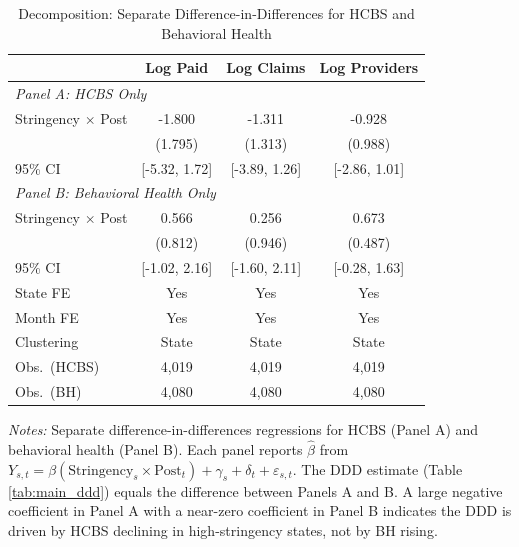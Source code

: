 \begin{table}[htbp]
\centering
\caption{Decomposition: Separate Difference-in-Differences for HCBS and Behavioral Health}
\label{tab:decomposition}
\small
\begin{tabular}{lccc}
\hline\hline
 & Log Paid & Log Claims & Log Providers \\
\hline
\multicolumn{4}{l}{\textit{Panel A: HCBS Only}} \\[3pt]
Stringency $\times$ Post & -1.800 & -1.311 & -0.928 \\
 & (1.795) & (1.313) & (0.988) \\
95\% CI & [-5.32, 1.72] & [-3.89, 1.26] & [-2.86, 1.01] \\
[6pt]
\multicolumn{4}{l}{\textit{Panel B: Behavioral Health Only}} \\[3pt]
Stringency $\times$ Post & 0.566 & 0.256 & 0.673 \\
 & (0.812) & (0.946) & (0.487) \\
95\% CI & [-1.02, 2.16] & [-1.60, 2.11] & [-0.28, 1.63] \\
[6pt]
\hline
State FE & Yes & Yes & Yes \\
Month FE & Yes & Yes & Yes \\
Clustering & State & State & State \\
Obs.~(HCBS) & 4,019 & 4,019 & 4,019 \\
Obs.~(BH) & 4,080 & 4,080 & 4,080 \\
\hline\hline
\end{tabular}
\begin{minipage}{0.85\textwidth}
\vspace{4pt}
\footnotesize
\textit{Notes:} Separate difference-in-differences regressions for HCBS (Panel A) and behavioral health (Panel B). Each panel reports $\hat{\beta}$ from $Y_{s,t} = \beta (\text{Stringency}_s \times \text{Post}_t) + \gamma_s + \delta_t + \varepsilon_{s,t}$. The DDD estimate (Table \ref{tab:main_ddd}) equals the difference between Panels A and B. A large negative coefficient in Panel A with a near-zero coefficient in Panel B indicates the DDD is driven by HCBS declining in high-stringency states, not by BH rising.
\end{minipage}
\end{table}
